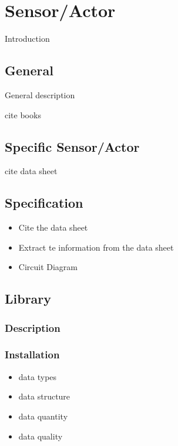 %
%

\chapter{Sensor/Actor}

Introduction

\section{General}

General description

cite books

\section{Specific Sensor/Actor}

cite data sheet

\section{Specification}

\begin{itemize}
  \item Cite the data sheet
  \item Extract te information from the data sheet
  \item Circuit Diagram
\end{itemize}

\section{Library}

\subsection{Description}

\subsection{Installation}

\begin{itemize}
    \item data types
    \item data structure
    \item data quantity
    \item data quality
\end{itemize}

